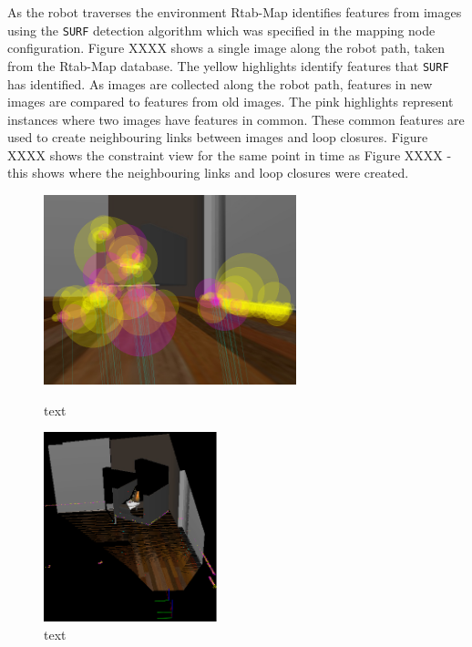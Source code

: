 \documentclass[a4paper]{article}
\begin{document}
As the robot traverses the environment Rtab-Map identifies features from images using the \texttt{SURF} detection algorithm which was specified in the mapping node configuration. Figure XXXX shows a single image along the robot path, taken from the Rtab-Map database. The yellow highlights identify features that \texttt{SURF} has identified. As images are collected along the robot path, features in new images are compared to features from old images. The pink highlights represent instances where two images have features in common. These common features are used to create neighbouring links between images and loop closures. Figure XXXX shows the constraint view for the same point in time as Figure XXXX - this shows where the neighbouring links and loop closures were created.
\begin{figure}[h]
\centering
\begin{minipage}[t]{0.45\textwidth}
\centering
\includegraphics[height=5.5cm]{kitchen_features}
\caption{text}
\end{minipage}
\hspace{1cm}
\begin{minipage}[t]{0.45\textwidth}
\centering
\includegraphics[height=5.5cm]{kitchen_constraints}
\caption{text}
\end{minipage}

\end{figure}
\end{document}
